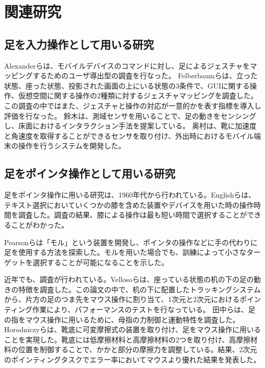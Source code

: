 \chapter{関連研究}

\section{足を入力操作として用いる研究}
Alexanderら\cite{Alexander:2012:PYB:2207676.2208575}は、モバイルデバイスのコマンドに対し、足によるジェスチャをマッピングするためのユーザ導出型の調査を行なった。
Felberbaumら\cite{Felberbaum:2018:BUF:3173574.3173908}は、立った状態、座った状態、投影された画面の上にいる状態の3条件で、GUIに関する操作、仮想空間に関する操作の2種類に対するジェスチャマッピングを調査した。この調査の中ではまた、ジェスチャと操作の対応が一意的かを表す指標を導入し評価を行なった。
鈴木\cite{ssuzuki_2009}は、測域センサを用いることで、足の動きをセンシングし、床面におけるインタラクション手法を提案している。
奥村\cite{okumura_2011}は、靴に加速度と角速度を取得することができるセンサを取り付け、外出時におけるモバイル端末の操作を行うシステムを開発した。

\section{足をポインタ操作として用いる研究}
足をポインタ操作に用いる研究は、1960年代から行われている。Englishら\cite{1698228}は、テキスト選択においていくつかの膝を含めた装置やデバイスを用いた時の操作時間を調査した。調査の結果、膝による操作は最も短い時間で選択することができることがわかった。

Pearsonら\cite{Pearson:1986:MMD:22627.22392, Pearson:1988:EET:49108.1046356}は「モル」という装置を開発し、ポインタの操作などに手の代わりに足を使用する方法を探索した。モルを用いた場合でも、訓練によって小さなターゲットを選択することが可能になることを示した。


近年でも、調査が行われている。Vellosoら\cite{velloso:hal-01599657}は、座っている状態の机の下の足の動きの特徴を調査した。この論文の中で、机の下に配置したトラッキングシステムから、片方の足のつま先をマウス操作に割り当て、1次元と2次元におけるポインティング作業により、パフォーマンスのテストを行なっている。
田中ら\cite{110004704997}は、足の指をマウス操作に用いるために、母指の力制御と運動特性を調査した。
Horodniczyら\cite{Horodniczy:2017:FHE:3025453.3025625}は、靴底に可変摩擦式の装置を取り付け、足をマウス操作に用いることを実現した。靴底には低摩擦材料と高摩擦材料の2つを取り付け、高摩擦材料の位置を制御することで、かかと部分の摩擦力を調整している。結果、2次元のポインティングタスクでエラー率においてマウスより優れた結果を発表した。
\section{}





